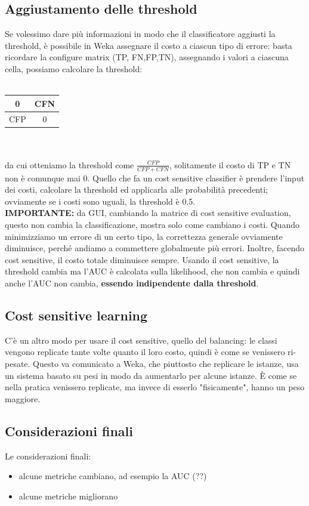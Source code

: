 \documentclass{article}
\begin{document}
\subsection{Aggiustamento delle threshold}
Se volessimo dare più informazioni in modo che il classificatore aggiusti la threshold, è possibile in Weka assegnare il costo a ciascun tipo di errore: basta ricordare la configure matrix (TP, FN,FP,TN), assegnando i valori a ciascuna cella, possiamo calcolare la threshold:\\\\
\begin{tabular}{ |c|c|}
\hline
0 & CFN\\
\hline
CFP & 0\\
\hline
\end{tabular}\\\\ da cui otteniamo la threshold come $\frac{CFP}{CFP+CFN}$, solitamente il costo di TP e TN non è comunque mai 0. Quello che fa un cost sensitive classifier è prendere l'input dei costi, calcolare la threshold ed applicarla alle probabilità precedenti; ovviamente se i costi sono uguali, la threshold è 0.5.
\\ \textbf{IMPORTANTE: }da GUI, cambiando la matrice di cost sensitive evaluation, questo non cambia la classificazione, mostra solo come cambiano i costi. Quando minimizziamo un errore di un certo tipo, la correttezza generale ovviamente diminuisce, perché andiamo a commettere globalmente più errori. Inoltre, facendo cost sensitive, il costo totale diminuisce sempre. Usando il cost sensitive, la threshold cambia ma l'AUC è calcolata sulla likelihood, che non cambia e quindi anche l'AUC non cambia, \textbf{essendo indipendente dalla threshold}.
\subsection{Cost sensitive learning}
C'è un altro modo per usare il cost sensitive, quello del balancing: le classi vengono replicate tante volte quanto il loro costo, quindi è come se venissero ri-pesate. Questo va comunicato a Weka, che piuttosto che replicare le istanze, usa un sistema basato su pesi in modo da aumentarlo per alcune istanze. È come se nella pratica venissero replicate, ma invece di esserlo "fisicamente", hanno un peso maggiore.
\subsection{Considerazioni finali}
Le considerazioni finali:
\begin{itemize}
\item alcune metriche cambiano, ad esempio la AUC (??)
\item alcune metriche migliorano
\end{itemize}
\end{document}
